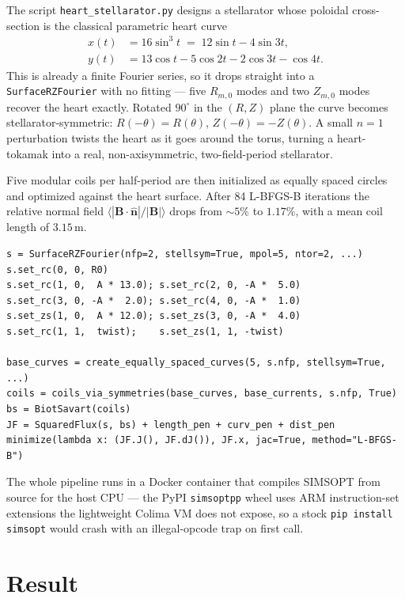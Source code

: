 \documentclass[11pt,a4paper]{article}
\begin{document}
The script \texttt{heart\_stellarator.py} designs a stellarator whose
poloidal cross-section is the classical parametric heart curve
\begin{align*}
  x(t) &= 16\sin^{3} t \;=\; 12\sin t - 4\sin 3t, \\
  y(t) &= 13\cos t - 5\cos 2t - 2\cos 3t - \cos 4t.
\end{align*}
This is already a finite Fourier series, so it drops straight into a
\texttt{SurfaceRZFourier} with no fitting --- five $R_{m,0}$ modes and
two $Z_{m,0}$ modes recover the heart exactly. Rotated $90^{\circ}$ in
the $(R, Z)$ plane the curve becomes stellarator-symmetric:
$R(-\theta) = R(\theta)$, $Z(-\theta) = -Z(\theta)$. A small $n=1$
perturbation twists the heart as it goes around the torus, turning a
heart-tokamak into a real, non-axisymmetric, two-field-period stellarator.

Five modular coils per half-period are then initialized as equally spaced
circles and optimized against the heart surface. After 84 L-BFGS-B
iterations the relative normal field $\langle|\mathbf{B}\cdot\hat{\mathbf{n}}|/|\mathbf{B}|\rangle$
drops from $\sim 5\%$ to $1.17\%$, with a mean coil length of $3.15\,\mathrm{m}$.

\begin{lstlisting}[style=py,caption={Core of the heart-stellarator design.}]
s = SurfaceRZFourier(nfp=2, stellsym=True, mpol=5, ntor=2, ...)
s.set_rc(0, 0, R0)
s.set_rc(1, 0,  A * 13.0); s.set_rc(2, 0, -A *  5.0)
s.set_rc(3, 0, -A *  2.0); s.set_rc(4, 0, -A *  1.0)
s.set_zs(1, 0,  A * 12.0); s.set_zs(3, 0, -A *  4.0)
s.set_rc(1, 1,  twist);    s.set_zs(1, 1, -twist)

base_curves = create_equally_spaced_curves(5, s.nfp, stellsym=True, ...)
coils = coils_via_symmetries(base_curves, base_currents, s.nfp, True)
bs = BiotSavart(coils)
JF = SquaredFlux(s, bs) + length_pen + curv_pen + dist_pen
minimize(lambda x: (JF.J(), JF.dJ()), JF.x, jac=True, method="L-BFGS-B")
\end{lstlisting}

The whole pipeline runs in a Docker container that compiles SIMSOPT from
source for the host CPU --- the PyPI \texttt{simsoptpp} wheel uses ARM
instruction-set extensions the lightweight Colima VM does not expose, so
a stock \texttt{pip install simsopt} would crash with an illegal-opcode
trap on first call.

\section*{Result}
\end{document}
